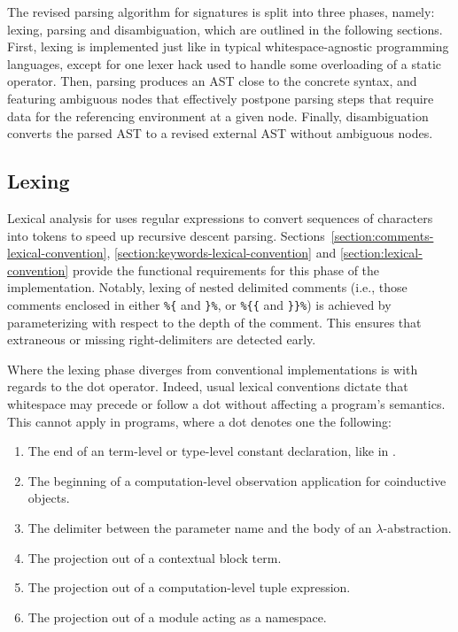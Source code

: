 The revised parsing algorithm for \Beluga signatures is split into three phases, namely: lexing, parsing and disambiguation, which are outlined in the following sections.
First, lexing is implemented just like in typical whitespace-agnostic programming languages, except for one lexer hack used to handle some overloading of a static operator.
Then, parsing produces an \ac{AST} close to the concrete syntax, and featuring ambiguous nodes that effectively postpone parsing steps that require data for the referencing environment at a given node.
Finally, disambiguation converts the parsed \ac{AST} to a revised external \ac{AST} without ambiguous nodes.

\subsection{Lexing}

Lexical analysis for \Beluga uses regular expressions to convert sequences of characters into tokens to speed up recursive descent parsing.
Sections~\ref{section:comments-lexical-convention}, \ref{section:keywords-lexical-convention} and \ref{section:lexical-convention} provide the functional requirements for this phase of the implementation.
Notably, lexing of nested delimited comments (i.e., those comments enclosed in either \verb|%{| and \verb|}%|, or \verb|%{{| and \verb|}}%|) is achieved by parameterizing with respect to the depth of the comment.
This ensures that extraneous or missing right-delimiters are detected early.

Where the lexing phase diverges from conventional implementations is with regards to the dot operator.
Indeed, usual lexical conventions dictate that whitespace may precede or follow a dot without affecting a program's semantics.
This cannot apply in \Beluga programs, where a dot denotes one the following:
\begin{enumerate}
\item
The end of an \LF term-level or type-level constant declaration, like in \Twelf.
\item
The beginning of a computation-level observation application for coinductive objects.
\item
The delimiter between the parameter name and the body of an \LF $\lambda$-abstraction.
\item
The projection out of a contextual \LF block term.
\item
The projection out of a computation-level tuple expression.
\item
The projection out of a module acting as a namespace.
\end{enumerate}

